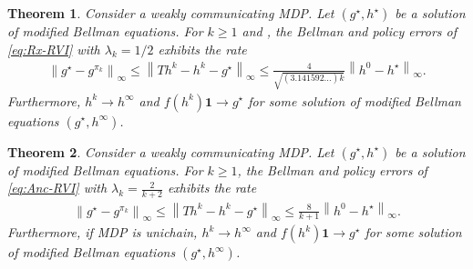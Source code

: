 \documentclass{article} %
\newcommand*{\infn}[1]{\left\|{#1}\right\|_{\infty}}
\newtheorem{theorem}{Theorem}
\begin{document}
\begin{theorem}\label{thm::Rx-RVI_optimized}
       Consider a weakly communicating MDP. Let $(g^{\star}, h^{\star})$ be a solution of modified Bellman equations. For $k\ge 1$ and , the Bellman and policy errors of \ref{eq:Rx-RVI} with $\lambda_k=1/2$ exhibits the rate
    \begin{align*}
       \infn{g^{\star}-g^{\pi_k}} \le \infn{Th^k-h^k-g^{\star}} \le  \frac{4}{\sqrt{(3.141592\dots) k}}\infn{h^0-h^{\star}}.
    \end{align*}
    Furthermore, $h^k\rightarrow h^\infty$ and $f(h^k)\mathbf{1}\rightarrow g^{\star}$ for some solution of modified Bellman equations  $(g^{\star}, h^\infty)$.  
\end{theorem}
\begin{theorem}\label{thm::Anc-RVI_optimized}
Consider a weakly communicating MDP. Let $(g^{\star}, h^{\star})$ be a solution of modified Bellman equations. For $k\ge 1$, the Bellman and policy errors of \ref{eq:Anc-RVI} with $\lambda_k = \frac{2}{k+2}$ exhibits the rate 
    \begin{align*}
      \infn{g^{\star}-g^{\pi_k}} \le  \infn{Th^k-h^k-g^{\star}} \le  \frac{8}{k+1}\infn{h^0-h^{\star}}. 
    \end{align*}
    Furthermore, if MDP is unichain, $h^k\rightarrow h^\infty$ and $f(h^k)\mathbf{1}\rightarrow g^{\star}$ for some solution of modified Bellman equations $(g^{\star}, h^\infty)$.  
\end{theorem}
\end{document}
